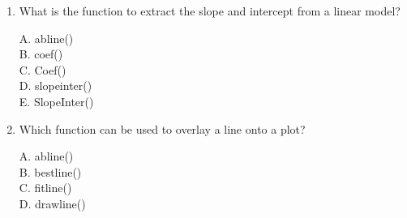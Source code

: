 \documentclass[12pt]{article}\usepackage[]{graphicx}\usepackage[]{color}
\begin{document}
\begin{enumerate}
\item What is the function to extract the slope and intercept from a linear model?

A. abline()\\
B. coef()\\
C. Coef()\\
D. slopeinter()\\
E. SlopeInter()\\

\item Which function can be used to overlay a line onto a plot?

A. abline()\\
B. bestline()\\
C. fitline()\\
D. drawline()\\
\end{enumerate}
\end{document}
